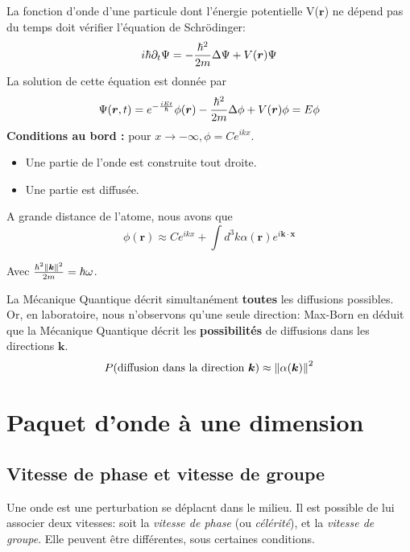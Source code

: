 \documentclass[../notesdecours]{subfiles}
\begin{document}
La fonction d'onde d'une particule dont l'énergie potentielle V($\bm{r}$) ne dépend pas du temps doit vérifier l'équation de Schrödinger:
\begin{equation}
i \hbar \partial_t \Psi = - \frac{\hbar^2}{2m} \Delta \Psi + V(\bm{r}) \Psi
\end{equation}
La solution de cette équation est donnée par
\begin{equation}
\Psi (\bm{r},t) = e^{- \frac{iEt}{\hbar}} \phi(\bm{r}) - \frac{\hbar^2}{2m} \Delta \phi + V(\bm{r})\phi = E \phi
\end{equation}
\textbf{Conditions au bord : } pour $x\rightarrow -\infty, \phi = Ce^{ikx}$.
\begin{itemize}
\item Une partie de l'onde est construite tout droite.
\item Une partie est diffusée.
\end{itemize}
A grande distance de l'atome, nous avons que 
\begin{equation}
\phi(\bm{r}) \approx Ce^{ikx} + \int d^3k \alpha(\bm{r})e^{i \bm{k} \cdot \bm{x}}
\end{equation}
\begin{center}
Avec $\frac{\hbar^2\norm{\bm{k}}^2}{2m} = \hbar \omega$.
\end{center}
La Mécanique Quantique décrit simultanément \textbf{toutes} les diffusions possibles. Or, en laboratoire, nous n'observons qu'une seule direction: Max-Born en déduit que la Mécanique Quantique décrit les \textbf{possibilités} de diffusions dans les directions $\bm{k}$.
\begin{equation}
P(\text{diffusion dans la direction $\bm{k}$}) \approx \norm{\alpha(\bm{k})}^2
\end{equation}

\section{Paquet d'onde à une dimension}
\subsection{Vitesse de phase et vitesse de groupe}
Une onde est une perturbation se déplacnt dans le milieu. Il est possible de lui associer deux vitesses: soit la \emph{vitesse de phase} (ou \emph{célérité}), et la \emph{vitesse de groupe}. Elle peuvent être différentes, sous certaines conditions.\\
\end{document}
